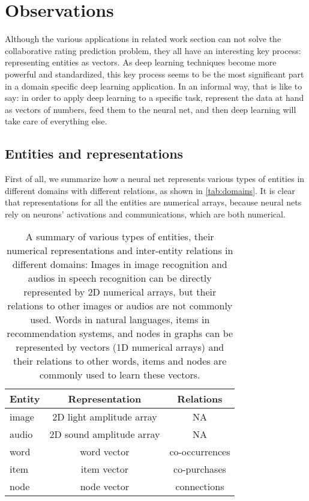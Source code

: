 \documentclass[letterpaper]{article}
\begin{document}
\section{Observations}
Although the various applications in related work section can not solve the 
collaborative rating prediction problem,
they all have an interesting key process: representing entities as vectors.
As deep learning techniques become more powerful and standardized, this key 
process seems to be the most significant part in a domain specific deep 
learning application.
In an informal way, that is like to say: in order to apply deep learning to a 
specific task, represent the data at hand as vectors of numbers,
feed them to the neural net, and then deep learning will take care of 
everything else.

\subsection{Entities and representations}
First of all, we summarize how a neural net represents various types of 
entities in different domains with different relations, as shown in 
\autoref{tab:domains}.
It is clear that representations for all the entities are numerical arrays, 
because neural nets rely on neurons' activations and communications, which 
are both numerical.
\begin{table}[!htb]
	\centering
	\caption{A summary of various types of entities, their numerical
		representations and inter-entity relations in different domains:
		Images in image recognition and audios in speech recognition can be 
		directly represented by 2D numerical arrays, 
		but their relations to other images or audios are not commonly 
		used. 
		Words in natural languages, items in recommendation systems, and nodes 
		in graphs can be represented by vectors (1D numerical arrays) and their 
		relations to other words, items and nodes are commonly used to learn 
		these vectors.}
	\begin{tabularx}{0.47\textwidth}{|X|c|c|} \hline \rowcolor{blue!50}
		Entity & Representation           & Relations \\ \hline
		image  & 2D light amplitude array & NA \\ \hline
		audio  & 2D sound amplitude array & NA \\ \hline
		word   & word vector              & co-occurrences \\ \hline
		item   & item vector              & co-purchases \\ \hline
		node   & node vector              & connections \\ \hline
	\end{tabularx}
	\label{tab:domains}
\end{table}
\end{document}
